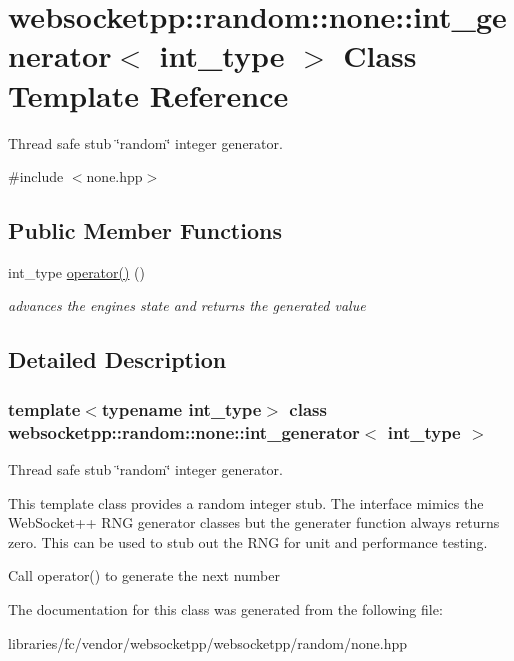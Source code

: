 \hypertarget{classwebsocketpp_1_1random_1_1none_1_1int__generator}{}\section{websocketpp\+:\+:random\+:\+:none\+:\+:int\+\_\+generator$<$ int\+\_\+type $>$ Class Template Reference}
\label{classwebsocketpp_1_1random_1_1none_1_1int__generator}


Thread safe stub \char`\"{}random\char`\"{} integer generator.  




{\ttfamily \#include $<$none.\+hpp$>$}

\subsection*{Public Member Functions}
\begin{DoxyCompactItemize}
\item 
\mbox{\label{classwebsocketpp_1_1random_1_1none_1_1int__generator_aecc2404c6eef19dbb5e585344bdd9069}} 
int\+\_\+type \mbox{\hyperlink{classwebsocketpp_1_1random_1_1none_1_1int__generator_aecc2404c6eef19dbb5e585344bdd9069}{operator()}} ()
\begin{DoxyCompactList}\small\item\em advances the engine\textquotesingle{}s state and returns the generated value \end{DoxyCompactList}\end{DoxyCompactItemize}


\subsection{Detailed Description}
\subsubsection*{template$<$typename int\+\_\+type$>$\newline
class websocketpp\+::random\+::none\+::int\+\_\+generator$<$ int\+\_\+type $>$}

Thread safe stub \char`\"{}random\char`\"{} integer generator. 

This template class provides a random integer stub. The interface mimics the Web\+Socket++ R\+NG generator classes but the generater function always returns zero. This can be used to stub out the R\+NG for unit and performance testing.

Call operator() to generate the next number 

The documentation for this class was generated from the following file\+:\begin{DoxyCompactItemize}
\item 
libraries/fc/vendor/websocketpp/websocketpp/random/none.\+hpp\end{DoxyCompactItemize}
